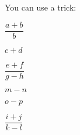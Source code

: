 \documentclass{article}
\newcommand{\myitem}{\item\vphantom{\usebox{\myhighitem}}}
\begin{document}
You can use a trick:
\begin{mylist}
\myitem $\dfrac{a+b}{b}$
\myitem $c+d$
\myitem $\dfrac{e+f}{g-h}$
\myitem $m-n$
\myitem $o-p$
\myitem $\dfrac{i+j}{k-l}$
\end{mylist}
\end{document}
